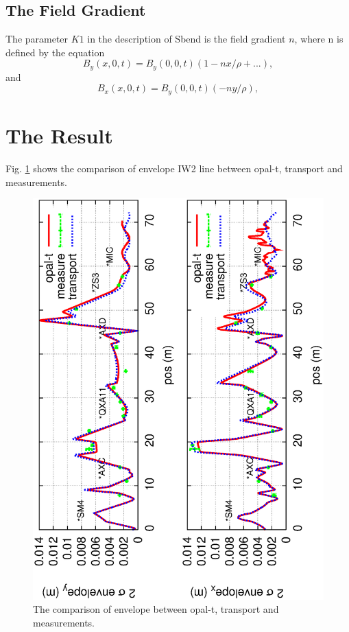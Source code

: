 \documentclass{article}
\begin{document}
\subsection{The Field Gradient}
The parameter $K1$ in the description of Sbend is the field gradient
$n$, where n is defined by the equation
\begin{equation}
\label{eq:gradient} B_y(x,0,t)=B_y(0,0,t)(1-nx/\rho+...),
\end{equation}
and
\begin{equation}
\label{eq:gradient2} B_x(x,0,t)=B_y(0,0,t)(-ny/\rho),
\end{equation}


\section{The Result}

Fig. \ref{fig:envelope} shows the comparison of envelope IW2 line between
opal-t, transport and measurements.


\begin{figure}[H]
\begin{center}
\includegraphics*[width=1.0\textwidth]{envelopefit}
\end{center}
\caption{The comparison of envelope between opal-t, transport and measurements. }
\label{fig:envelope}
\end{figure}
\end{document}
